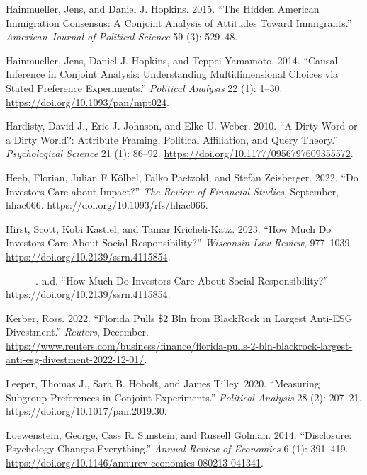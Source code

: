 \documentclass[
  12pt,
]{article}
\newlength{\cslhangindent}
\newlength{\cslentryspacingunit} %
\newenvironment{CSLReferences}[2] %
 {%
  \setlength{\parindent}{0pt}
  \ifodd #1
  \let\oldpar\par
  \def\par{\hangindent=\cslhangindent\oldpar}
  \fi
  \setlength{\parskip}{#2\cslentryspacingunit}
 }%
 {}
\begin{document}
\begin{CSLReferences}{1}{0}
\leavevmode{}%
Hainmueller, Jens, and Daniel J. Hopkins. 2015. {``The Hidden American Immigration Consensus: A Conjoint Analysis of Attitudes Toward Immigrants.''} \emph{American Journal of Political Science} 59 (3): 529--48.

\leavevmode{}%
Hainmueller, Jens, Daniel J. Hopkins, and Teppei Yamamoto. 2014. {``Causal Inference in Conjoint Analysis: Understanding Multidimensional Choices via Stated Preference Experiments.''} \emph{Political Analysis} 22 (1): 1--30. \url{https://doi.org/10.1093/pan/mpt024}.

\leavevmode{}%
Hardisty, David J., Eric J. Johnson, and Elke U. Weber. 2010. {``A Dirty Word or a Dirty World?: Attribute Framing, Political Affiliation, and Query Theory.''} \emph{Psychological Science} 21 (1): 86--92. \url{https://doi.org/10.1177/0956797609355572}.

\leavevmode{}%
Heeb, Florian, Julian F Kölbel, Falko Paetzold, and Stefan Zeisberger. 2022. {``Do Investors Care about Impact?''} \emph{The Review of Financial Studies}, September, hhac066. \url{https://doi.org/10.1093/rfs/hhac066}.

\leavevmode{}%
Hirst, Scott, Kobi Kastiel, and Tamar Kricheli-Katz. 2023. {``How Much Do Investors Care About Social Responsibility?''} \emph{Wisconsin Law Review}, 977--1039. \url{https://doi.org/10.2139/ssrn.4115854}.

\leavevmode{}%
---------. n.d. {``How Much Do Investors Care About Social Responsibility?''} \url{https://doi.org/10.2139/ssrn.4115854}.

\leavevmode{}%
Kerber, Ross. 2022. {``Florida Pulls {\$}2 Bln from BlackRock in Largest Anti-ESG Divestment.''} \emph{Reuters}, December. \url{https://www.reuters.com/business/finance/florida-pulls-2-bln-blackrock-largest-anti-esg-divestment-2022-12-01/}.

\leavevmode{}%
Leeper, Thomas J., Sara B. Hobolt, and James Tilley. 2020. {``Measuring Subgroup Preferences in Conjoint Experiments.''} \emph{Political Analysis} 28 (2): 207--21. \url{https://doi.org/10.1017/pan.2019.30}.

\leavevmode{}%
Loewenstein, George, Cass R. Sunstein, and Russell Golman. 2014. {``Disclosure: Psychology Changes Everything.''} \emph{Annual Review of Economics} 6 (1): 391--419. \url{https://doi.org/10.1146/annurev-economics-080213-041341}.


\end{CSLReferences}
\end{document}
